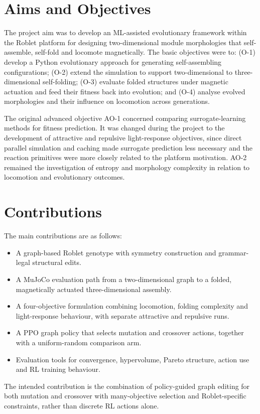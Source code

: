 \documentclass[12pt,a4paper]{report}
\begin{document}
\section{Aims and Objectives}
The project aim was to develop an ML-assisted evolutionary framework within the Roblet platform for designing two-dimensional module morphologies that self-assemble, self-fold and locomote magnetically. The basic objectives were to: (O-1) develop a Python evolutionary approach for generating self-assembling configurations; (O-2) extend the simulation to support two-dimensional to three-dimensional self-folding; (O-3) evaluate folded structures under magnetic actuation and feed their fitness back into evolution; and (O-4) analyse evolved morphologies and their influence on locomotion across generations.

The original advanced objective AO-1 concerned comparing surrogate-learning methods for fitness prediction. It was changed during the project to the development of attractive and repulsive light-response objectives, since direct parallel simulation and caching made surrogate prediction less necessary and the reaction primitives were more closely related to the platform motivation. AO-2 remained the investigation of entropy and morphology complexity in relation to locomotion and evolutionary outcomes.

\section{Contributions}
The main contributions are as follows:
\begin{itemize}
    \item A graph-based Roblet genotype with symmetry construction and grammar-legal structural edits.
    \item A MuJoCo evaluation path from a two-dimensional graph to a folded, magnetically actuated three-dimensional assembly.
    \item A four-objective formulation combining locomotion, folding complexity and light-response behaviour, with separate attractive and repulsive runs.
    \item A PPO graph policy that selects mutation and crossover actions, together with a uniform-random comparison arm.
    \item Evaluation tools for convergence, hypervolume, Pareto structure, action use and RL training behaviour.
\end{itemize}
The intended contribution is the combination of policy-guided graph editing for both mutation and crossover with many-objective selection and Roblet-specific constraints, rather than discrete RL actions alone.
\end{document}
